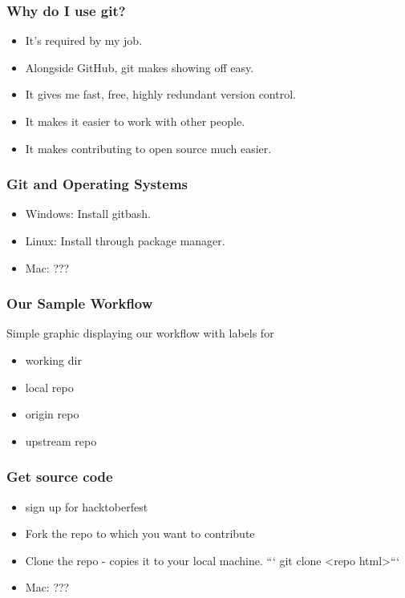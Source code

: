 \documentclass[unknownkeysallowed]{beamer}
\begin{document}
\begin{frame}
    \frametitle{Why do I use git?}
    \begin{itemize}
        \item{It's required by my job.}
        \item{Alongside GitHub, git makes showing off easy.}
        \item{It gives me fast, free, highly redundant version control.}
        \item{It makes it easier to work with other people.}
        \item{It makes contributing to open source much easier.}
    \end{itemize}
    \vspace{1cm} %
\end{frame}

\begin{frame}
    \frametitle{Git and Operating Systems}
    \begin{itemize}
        \item{Windows: Install gitbash.}
        \item{Linux: Install through package manager.}
        \item{Mac: ???}
    \end{itemize}
    \vspace{1cm} %
\end{frame}

\begin{frame}
    \frametitle{Our Sample Workflow}
      Simple graphic displaying our workflow with labels for
      \begin{itemize}
        \item{working dir}
        \item{local repo}
        \item{origin repo}
        \item{upstream repo}
      \end{itemize}
    \vspace{1cm} %
\end{frame}

\begin{frame}
    \frametitle{Get source code}
    \begin{itemize}
        \item{sign up for hacktoberfest}
        \item{Fork the repo to which you want to contribute}
        \item{Clone the repo - copies it to your local machine.  ``` git clone <repo html>```}
        \item{Mac: ???}
    \end{itemize}
    \vspace{1cm} %
\end{frame}
\end{document}
